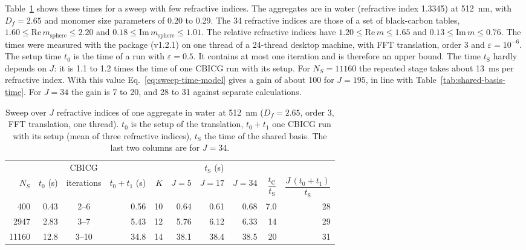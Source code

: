 \documentclass[11pt,a4paper]{article}
\renewcommand{\arraystretch}{1.6}
\begin{document}
Table~\ref{tab:shared-basis-gain} shows these times for a sweep with few refractive indices.
The aggregates are in water (refractive index 1.3345) at \SI{512}{\nano\meter}, with $D_f = 2.65$ and monomer size parameters of 0.20 to 0.29.
The 34 refractive indices are those of a set of black-carbon tables, $1.60 \leq \mathrm{Re}\,m_\mathrm{sphere} \leq 2.20$ and $0.18 \leq \mathrm{Im}\,m_\mathrm{sphere} \leq 1.01$.
The relative refractive indices have $1.20 \leq \mathrm{Re}\,m \leq 1.65$ and $0.13 \leq \mathrm{Im}\,m \leq 0.76$.
The times were measured with the package (v1.2.1) on one thread of a 24-thread desktop machine, with FFT translation, order 3 and $\varepsilon = 10^{-6}$.
The setup time $t_0$ is the time of a run with $\varepsilon = 0.5$.
It contains at most one iteration and is therefore an upper bound.
The time $t_\mathrm{S}$ hardly depends on $J$: it is 1.1 to 1.2 times the time of one CBICG run with its setup.
For $N_S = 11160$ the repeated stage takes about \SI{13}{\milli\second} per refractive index.
With this value Eq.~\eqref{eq:sweep-time-model} gives a gain of about 100 for $J = 195$, in line with Table~\ref{tab:shared-basis-time}.
For $J = 34$ the gain is 7 to 20, and 28 to 31 against separate calculations.

\begin{table}[htbp]
\caption{Sweep over $J$ refractive indices of one aggregate in water at \SI{512}{\nano\meter} ($D_f = 2.65$, order 3, FFT translation, one thread). $t_0$ is the setup of the translation, $t_0 + t_1$ one CBICG run with its setup (mean of three refractive indices), $t_\mathrm{S}$ the time of the shared basis. The last two columns are for $J = 34$.}
\label{tab:shared-basis-gain}
\centering
\renewcommand{\arraystretch}{1.2}
\begin{tabular}{@{} rrcrrrrrrr @{}}
\toprule
 & & CBICG & & & \multicolumn{3}{c}{$t_\mathrm{S}$ (\si{\second})} & & \\
\cmidrule(lr){6-8}
$N_S$ & $t_0$ (\si{\second}) & iterations & $t_0 + t_1$ (\si{\second}) & $K$ & $J = 5$ & $J = 17$ & $J = 34$ & $\dfrac{t_\mathrm{C}}{t_\mathrm{S}}$ & $\dfrac{J\,(t_0 + t_1)}{t_\mathrm{S}}$ \\
\midrule
  400 &  0.43 & 2--6  &  0.56 & 10 &  0.64 &  0.61 &  0.68 &  7.0 & 28 \\
 2947 &  2.83 & 3--7  &  5.43 & 12 &  5.76 &  6.12 &  6.33 & 14   & 29 \\
11160 & 12.8  & 3--10 & 34.8  & 14 & 38.1  & 38.4  & 38.5  & 20   & 31 \\
\bottomrule
\end{tabular}
\end{table}
\end{document}
